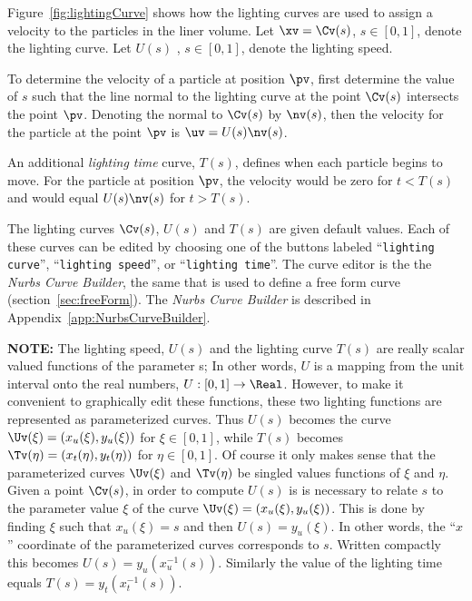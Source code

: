 \documentclass[12pt]{article}
\newcommand{\cmd}[1]{``{\tt #1}''}
\begin{document}
Figure~\ref{fig:lightingCurve} shows how the lighting curves are used to assign
a velocity to the particles in the liner volume. Let $\xv=\Cv(s)$, $s\in[0,1]$,
denote the lighting curve. Let $U(s)$ , $s\in[0,1]$, denote the lighting speed.

To determine the velocity of a particle at position $\pv$, first determine
the value of $s$ such that the line normal to the lighting curve at the point $\Cv(s)$
intersects the point $\pv$. 
Denoting the normal to $\Cv(s)$ by $\nv(s)$, then the velocity
for the particle at the point $\pv$ is $\uv=U(s)\nv(s)$. 


An additional {\em lighting time} curve, $T(s)$, defines when each particle begins to move.
For the particle at position $\pv$, the velocity would be zero for $t<T(s)$ and would equal
$U(s)\nv(s)$ for $t>T(s)$.


The lighting curves $\Cv(s)$, $U(s)$ and $T(s)$ are given default values. Each of these
curves can be edited by choosing one of the buttons labeled \cmd{lighting curve}, \cmd{lighting speed},
or \cmd{lighting time}. The curve editor is the 
the {\em Nurbs Curve Builder}, the same that is used to define a free form curve (section~\ref{sec:freeForm}).
The {\em Nurbs Curve Builder} is described in Appendix~\ref{app:NurbsCurveBuilder}.


{\bf NOTE:} The lighting speed, $U(s)$ and the lighting curve $T(s)$
are really scalar valued functions of the parameter s; In other words,
 $U$ is a mapping from the unit interval onto the real numbers, $U : [0,1] \rightarrow
\Real$. However, to make it convenient to graphically edit these
functions, these two lighting functions are represented as
parameterized curves.  Thus $U(s)$ becomes the curve
$\Uv(\xi)=(x_u(\xi),y_u(\xi))$ for $\xi \in [0,1]$, while $T(s)$
becomes $\Tv(\eta)=(x_t(\eta),y_t(\eta))$ for $\eta \in [0,1]$.  Of
course it only makes sense that the parameterized curves $\Uv(\xi)$
and $\Tv(\eta)$ be singled values functions of $\xi$ and $\eta$.
Given a point $\Cv(s)$, in order to compute $U(s)$ is is necessary to relate $s$ to the
parameter value $\xi$ of the curve $\Uv(\xi)=(x_u(\xi),y_u(\xi))$.
This is done by finding $\xi$ such that $x_u(\xi)=s$ and then $U(s)=y_u(\xi)$. In other words,
the ``$x$'' coordinate of the parameterized curves corresponds to $s$.
Written compactly this
becomes $U(s)=y_u(x_u^{-1}(s))$.
Similarly the value of the lighting time equals $T(s) = y_t(x_t^{-1}(s))$.
\end{document}
